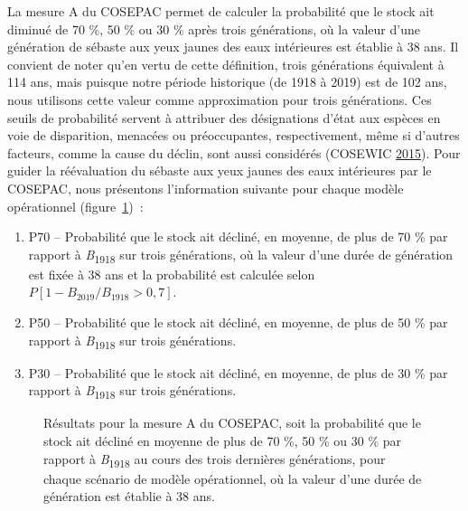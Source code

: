 \documentclass[11pt]{book}
\begin{document}
La mesure A du COSEPAC permet de calculer la probabilité que le stock ait diminué de 70 \%, 50 \% ou 30 \% après trois générations, où la valeur d'une génération de sébaste aux yeux jaunes des eaux intérieures est établie à 38 ans. Il convient de noter qu'en vertu de cette définition, trois générations équivalent à 114 ans, mais puisque notre période historique (de 1918 à 2019) est de 102 ans, nous utilisons cette valeur comme approximation pour trois générations. Ces seuils de probabilité servent à attribuer des désignations d'état aux espèces en voie de disparition, menacées ou préoccupantes, respectivement, même si d'autres facteurs, comme la cause du déclin, sont aussi considérés (COSEWIC \protect\hyperlink{ref-cosewic2015}{2015}). Pour guider la réévaluation du sébaste aux yeux jaunes des eaux intérieures par le COSEPAC, nous présentons l'information suivante pour chaque modèle opérationnel (figure~\ref{fig:cosewic-metrics})~:
\begin{enumerate}
\def\labelenumi{\arabic{enumi}.}

\item
  P70 -- Probabilité que le stock ait décliné, en moyenne, de plus de 70 \% par rapport à \emph{B}\textsubscript{1918} sur trois générations, où la valeur d'une durée de génération est fixée à 38 ans et la probabilité est calculée selon \(P[1 - B_{2019}/B_{1918} > 0,7]\).
\item
  P50 -- Probabilité que le stock ait décliné, en moyenne, de plus de 50 \% par rapport à \emph{B}\textsubscript{1918} sur trois générations.
\item
  P30 -- Probabilité que le stock ait décliné, en moyenne, de plus de 30 \% par rapport à \emph{B}\textsubscript{1918} sur trois générations.
\end{enumerate}

\begin{figure}[htb]

{\centering {} 

}

\caption{Résultats pour la mesure A du COSEPAC, soit la probabilité que le stock ait décliné en moyenne de plus de 70 \%, 50 \% ou 30 \% par rapport à \emph{B}\textsubscript{1918} au cours des trois dernières générations, pour chaque scénario de modèle opérationnel, où la valeur d'une durée de génération est établie à 38 ans.}\label{fig:cosewic-metrics}
\end{figure}
\hypertarget{risque-dextinction-mesure-e-du-cosepac}{%
\label{risque-dextinction-mesure-e-du-cosepac}}
\end{document}
